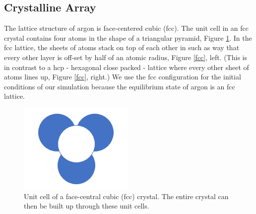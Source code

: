 \documentclass{article}
\begin{document}
\begin{multicols}{2}
\subsection{Crystalline Array}

The lattice structure of argon is face-centered cubic (fcc).  The unit cell in an fcc crystal contains four atoms in the shape of a triangular pyramid, Figure \ref{unitcell}.  In the fcc lattice, the sheets of atoms stack on top of each other in such as way that every other layer is off-set by half of an atomic radius, Figure \ref{fcc}, left.  (This is in contrast to a hcp - hexagonal close packed - lattice where every other sheet of atoms lines up, Figure \ref{fcc}, right.)  \cite{crystal}  We use the fcc configuration for the initial conditions of our simulation because the equilibrium state of argon is an fcc lattice.  

\begin{figure}[H]
\begin{center}
\includegraphics[width=0.65\linewidth]{plots/crystal_structure.png}
\caption{Unit cell of a face-central cubic (fcc) crystal.  The entire crystal can then be built up through these unit cells.}
\label{unitcell}
\end{center}
\end{figure}


\end{multicols}
\end{document}
